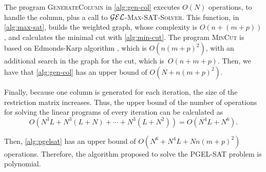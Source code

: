 The program \textsc{GenerateColumn} in \cref{alg:gen-col} executes $O(N)$ operations, to handle the column, plus a call to $\mathcal{GEL}$-\textsc{Max-SAT-Solver}. This function, in \cref{alg:max-sat}, builds the weighted graph, whose complexity is $O(n + (m + p))$, and calculates the minimal cut with \cref{alg:min-cut}. The program \textsc{MinCut} is based on Edmonds-Karp algorithm \citep{cormen2009introduction}, which is $O(n (m + p)^2)$, with an additional search in the graph for the cut, which is~$O(n + m + p)$. Then, we have that \cref{alg:gen-col} has an upper bound of $O(N + n(m + p)^2)$. 

Finally, because one column is generated for each iteration, the size of the restriction matrix increases. Thus, the upper bound of the number of operations for solving the linear programs of every iteration can be calculated as
\[
	O( N^3L + N^3 (L+N) + \cdots + N^3 (L + N^2)) = O(N ^4L + N^6).
\]

Then, \cref{alg:pgelsat} has an upper bound of $O(N^6 + N^4L + Nn(m+p)^2)$ operations. Therefore, the algorithm proposed to solve the PGEL-SAT problem is polynomial.
